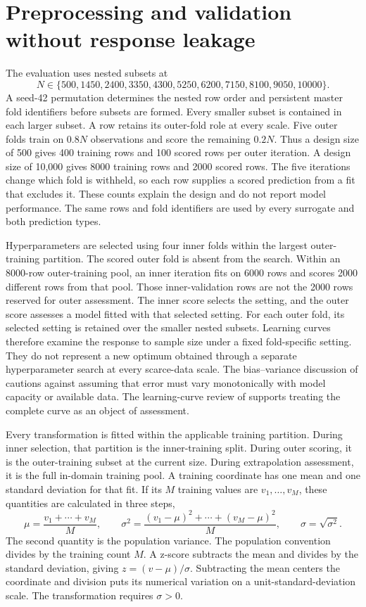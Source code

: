 \section{Preprocessing and validation without response leakage}

The evaluation uses nested subsets at
\begin{equation}
N\in\{500,1450,2400,3350,4300,5250,6200,7150,8100,9050,10000\}.
\label{eq:reactor_nested_sample_sizes}
\end{equation}
A seed-42 permutation determines the nested row order and persistent master fold identifiers before subsets are formed. Every smaller subset is contained in each larger subset. A row retains its outer-fold role at every scale. Five outer folds train on $0.8N$ observations and score the remaining $0.2N$. Thus a design size of 500 gives 400 training rows and 100 scored rows per outer iteration. A design size of 10,000 gives 8000 training rows and 2000 scored rows. The five iterations change which fold is withheld, so each row supplies a scored prediction from a fit that excludes it. These counts explain the design and do not report model performance. The same rows and fold identifiers are used by every surrogate and both prediction types.

Hyperparameters are selected using four inner folds within the largest outer-training partition. The scored outer fold is absent from the search. Within an 8000-row outer-training pool, an inner iteration fits on 6000 rows and scores 2000 different rows from that pool. Those inner-validation rows are not the 2000 rows reserved for outer assessment. The inner score selects the setting, and the outer score assesses a model fitted with that selected setting. For each outer fold, its selected setting is retained over the smaller nested subsets. Learning curves therefore examine the response to sample size under a fixed fold-specific setting. They do not represent a new optimum obtained through a separate hyperparameter search at every scarce-data scale. The bias--variance discussion of \citet{Belkin2019} cautions against assuming that error must vary monotonically with model capacity or available data. The learning-curve review of \citet{VieringLoog2023} supports treating the complete curve as an object of assessment.

Every transformation is fitted within the applicable training partition. During inner selection, that partition is the inner-training split. During outer scoring, it is the outer-training subset at the current size. During extrapolation assessment, it is the full in-domain training pool. A training coordinate has one mean and one standard deviation for that fit. If its $M$ training values are $v_1,\ldots,v_M$, these quantities are calculated in three steps,
\[
\mu=\frac{v_1+\cdots+v_M}{M},\qquad
\sigma^2=\frac{(v_1-\mu)^2+\cdots+(v_M-\mu)^2}{M},\qquad
\sigma=\sqrt{\sigma^2}.
\]
The second quantity is the population variance. The population convention divides by the training count $M$. A z-score subtracts the mean and divides by the standard deviation, giving $z=(v-\mu)/\sigma$. Subtracting the mean centers the coordinate and division puts its numerical variation on a unit-standard-deviation scale. The transformation requires $\sigma>0$.

